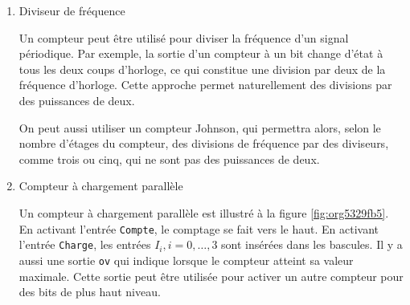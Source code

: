 \documentclass[letter, oneside]{book}
\begin{document}
\begin{enumerate}
On peut construire des signaux de synchronisation distincts en
combinant deux par deux au moyen d'une porte ET des signaux de sortie
voisins (dans le cycle) ou leurs compléments. Le tableau \ref{tab:org69eccee}
donne les paires de sorties à combiner pour ce faire avec le compteur
Johnson de quatre bits.

Nous avons appliqué ce principe à un compteur Johnson de deux bits,
présenté sur la figure \ref{fig:org29f66d7}. La figure montre une trace
d'exécution avec les signaux de sortie. On y voit que chacun des
quatre signaux est activé à son tour.

\begin{figure}[htbp]
\centering

\caption{\label{fig:org29f66d7}Compteur Johnson à 2 bits et circuit de décodage pour signaux de synchronisation}
\end{figure}

Si on s'intéresse aux sorties des bascules de ce même compteur
Johnson, on peut voir sur la trace d'exécution de la figure
\ref{fig:org841c6d6} qu'on obtient des signaux en \textbf{quadrature},
c'est-à-dire que les sorties sont déphasées de 90 degrés les unes par
rapport aux autres, comme le sont des fonctions \(\sin(), \cos(),
-\sin(), -\cos()\).

\begin{figure}[htbp]
\centering

\caption{\label{fig:org841c6d6}Signaux en quadrature obtenus au moyen d'un compteur Johnson à 2 bits}
\end{figure} 

\item Diviseur de fréquence
\label{sec:org2d27ff8}

Un compteur peut être utilisé pour diviser la fréquence d'un signal
périodique. Par exemple, la sortie d'un compteur à un bit change
d'état à tous les deux coups d'horloge, ce qui constitue une division
par deux de la fréquence d'horloge. Cette approche permet
naturellement des divisions par des puissances de deux.

On peut aussi utiliser un compteur Johnson, qui permettra alors, selon
le nombre d'étages du compteur, des divisions de fréquence par des
diviseurs, comme trois ou cinq, qui ne sont pas des puissances de deux.

\item Compteur à chargement parallèle
\label{sec:org9a1ae20}

Un compteur à chargement parallèle est illustré à la figure
\ref{fig:org5329fb5}. En activant l'entrée \texttt{Compte}, le comptage
se fait vers le haut. En activant l'entrée \texttt{Charge}, les entrées \(I_i, i=0, \ldots, 3\) sont insérées dans les bascules. Il y a aussi une
sortie \texttt{ov} qui indique lorsque le compteur atteint sa valeur
maximale. Cette sortie peut être utilisée pour activer un autre
compteur pour des bits de plus haut niveau.


\end{enumerate}
\end{document}
